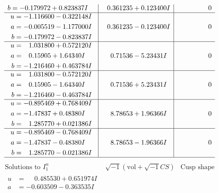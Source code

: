 \documentclass[1p]{elsarticle_modified}
\theoremstyle{definition}
\newcommand{\I}{\sqrt{-1}}
\begin{document}
$$\begin{array}{c|c|c}
\begin{aligned}
b &= -0.179972 + 0.823837 I\end{aligned}
 & \phantom{-}0.361235 + 0.123400 I & \phantom{-0.000000 } 0 \\ \hline\begin{aligned}
u &= -1.116600 - 0.322148 I \\
a &= -0.005519 - 1.177000 I \\
b &= -0.179972 - 0.823837 I\end{aligned}
 & \phantom{-}0.361235 - 0.123400 I & \phantom{-0.000000 } 0 \\ \hline\begin{aligned}
u &= \phantom{-}1.031800 + 0.572120 I \\
a &= \phantom{-}0.15905 + 1.64340 I \\
b &= -1.216460 + 0.463784 I\end{aligned}
 & \phantom{-}0.71536 - 5.23431 I & \phantom{-0.000000 } 0 \\ \hline\begin{aligned}
u &= \phantom{-}1.031800 - 0.572120 I \\
a &= \phantom{-}0.15905 - 1.64340 I \\
b &= -1.216460 - 0.463784 I\end{aligned}
 & \phantom{-}0.71536 + 5.23431 I & \phantom{-0.000000 } 0 \\ \hline\begin{aligned}
u &= -0.895469 + 0.768409 I \\
a &= -1.47837 + 0.48380 I \\
b &= \phantom{-}1.285770 + 0.021386 I\end{aligned}
 & \phantom{-}8.78653 + 1.96366 I & \phantom{-0.000000 } 0 \\ \hline\begin{aligned}
u &= -0.895469 - 0.768409 I \\
a &= -1.47837 - 0.48380 I \\
b &= \phantom{-}1.285770 - 0.021386 I\end{aligned}
 & \phantom{-}8.78653 - 1.96366 I & \phantom{-0.000000 } 0\\
 \hline 
 \end{array}$$\newpage$$\begin{array}{c|c|c}  
\text{Solutions to }I^u_{1}& \I (\text{vol} + \sqrt{-1}CS) & \text{Cusp shape}\\
 \hline 
\begin{aligned}
u &= \phantom{-}0.485530 + 0.651974 I \\
a &= -0.603509 - 0.363535 I \\

\end{aligned}
\end{array}$$
\end{document}
